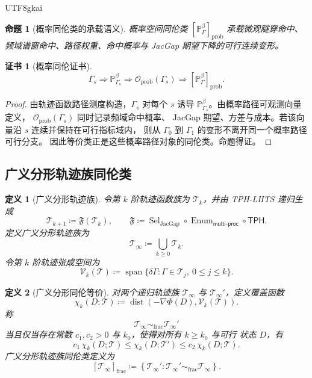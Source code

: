 \documentclass[12pt]{article}
\newtheorem{definition}{定义}[section]
\newtheorem{proposition}{命题}[section]
\newtheorem{Certificate}{证书}[section]
\newcommand{\TPH}{\ensuremath{\mathsf{TPH}}}
\newcommand{\DefEq}{\coloneqq}
\newcommand{\Prob}{\mathbb P}
\DeclareMathOperator{\JacGap}{JacGap}
\DeclareMathOperator{\Span}{span}
\DeclareMathOperator{\Sel}{Sel}
\DeclareMathOperator{\dist}{dist}
\DeclareMathOperator{\Enum}{Enum}
\begin{document}
\begin{CJK*}{UTF8}{gkai}
\begin{proposition}[概率同伦类的承载语义]
概率空间同伦类 \([\mathbb P_\Gamma^\beta]_{\mathrm{prob}}\) 承载微观隧穿命中、
频域谱窗命中、路径权重、命中概率与 JacGap 期望下降的可行连续变形。
\end{proposition}

\begin{Certificate}[概率同伦证书]
\[
\boxed{
\Gamma_s
\Rightarrow
\Prob_{\Gamma_s}^{\beta}
\Rightarrow
\mathcal O_{\mathrm{prob}}(\Gamma_s)
\Rightarrow
[\mathbb P_\Gamma^\beta]_{\mathrm{prob}}.
}
\]
\end{Certificate}

\begin{proof}
由轨迹函数路径测度构造，\(\Gamma_s\) 对每个 \(s\) 诱导
\(\Prob_{\Gamma_s}^{\beta}\)。由概率路径可观测向量定义，
\(\mathcal O_{\mathrm{prob}}(\Gamma_s)\) 同时记录频域命中概率、
JacGap 期望、方差与成本。若该向量沿 \(s\) 连续并保持在可行指标域内，
则从 \(\Gamma_0\) 到 \(\Gamma_1\) 的变形不离开同一个概率路径可行分支。
因此等价类正是这些概率路径对象的同伦类。命题得证。
\end{proof}

\subsection{广义分形轨迹族同伦类}
\label{subsec:fractal-trajectory-homotopy-class}

\begin{definition}[广义分形轨迹族]
令第 \(k\) 阶轨迹函数族为 \(\mathcal T_k\)，并由 TPH-LHTS 递归生成
\[
\mathcal T_{k+1}
\DefEq
\mathfrak F(\mathcal T_k),
\qquad
\mathfrak F
\DefEq
\Sel_{\JacGap}
\circ
\Enum_{\mathsf{multi\mbox{-}proc}}
\circ
\TPH.
\]
定义广义分形轨迹族为
\[
\boxed{
\mathcal T_\infty
\DefEq
\bigcup_{k\ge0}\mathcal T_k.
}
\]
令第 \(k\) 阶轨迹张成空间为
\[
\mathcal V_k(\mathcal T)
\DefEq
\Span\{\delta\Gamma:\Gamma\in\mathcal T_j,\ 0\le j\le k\}.
\]
\end{definition}

\begin{definition}[广义分形同伦等价]
对两个递归轨迹族 \(\mathcal T_\infty\) 与 \(\mathcal T_\infty'\)，定义覆盖函数
\[
\chi_k(D;\mathcal T)
\DefEq
\dist\!\left(
-\nabla\Phi(D),\mathcal V_k(\mathcal T)
\right).
\]
称
\[
\mathcal T_\infty\sim_{\mathrm{frac}}\mathcal T_\infty'
\]
当且仅当存在常数 \(c_1,c_2>0\) 与 \(k_0\)，使得对所有 \(k\ge k_0\) 与可行
状态 \(D\)，有
\[
c_1\,\chi_k(D;\mathcal T)
\le
\chi_k(D;\mathcal T')
\le
c_2\,\chi_k(D;\mathcal T).
\]
广义分形轨迹族同伦类定义为
\[
\boxed{
[\mathcal T_\infty]_{\mathrm{frac}}
\DefEq
\left\{
\mathcal T_\infty':
\mathcal T_\infty'\sim_{\mathrm{frac}}\mathcal T_\infty
\right\}.
}
\]
\end{definition}


\end{CJK*}
\end{document}
